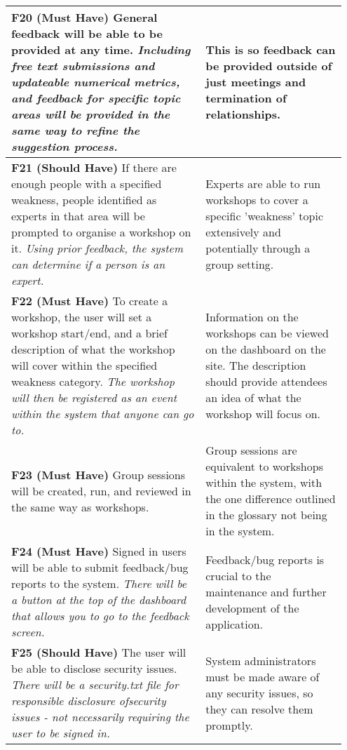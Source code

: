 \documentclass[10pt]{article}
\begin{document}
\begin{longtable}{|p{0.55\linewidth}|p{0.4\linewidth}|}
    \textbf{F20 (Must Have) }
    General feedback will be able to be provided at any time.
    \textit{Including free text submissions and updateable numerical metrics,
    and feedback for specific topic areas will be provided in the same way to
    refine the suggestion process.}
        &
    This is so feedback can be provided outside of just meetings and termination
    of relationships.
    \\ \hline

    \textbf{F21 (Should Have) }
    If there are enough people with a specified weakness, people identified as
    experts in that area will be prompted to organise a workshop on it.
    \textit{Using prior feedback, the system can determine if a person is an
    expert.}
        &
    Experts are able to run workshops to cover a specific 'weakness' topic
    extensively and potentially through a group setting.
    \\ \hline

    \textbf{F22 (Must Have) }
    To create a workshop, the user will set a workshop start/end, and a brief
    description of what the workshop will cover within the specified weakness
    category.
    \textit{The workshop will then be registered as an event within the system
    that anyone can go to.}
        &
    Information on the workshops can be viewed on the dashboard on the site. The
    description should provide attendees an idea of what the workshop will focus
    on.
    \\ \hline

    \textbf{F23 (Must Have) }
    Group sessions will be created, run, and reviewed in the same way as
    workshops.
        &
    Group sessions are equivalent to workshops within the system, with the one
    difference outlined in the glossary not being in the system.
    \\ \hline

    \textbf{F24 (Must Have) }
    Signed in users will be able to submit feedback/bug reports to the system.
    \textit{There will be a button at the top of the dashboard that allows you
    to go to the feedback screen.}
        &
    Feedback/bug reports is crucial to the maintenance and further development
    of the application.
    \\ \hline

    \textbf{F25 (Should Have) }
    The user will be able to disclose security issues.
    \textit{There will be a security.txt file \cite{security_txt} for
    responsible disclosure ofsecurity issues - not necessarily requiring the
    user to be signed in.}
        &
    System administrators must be made aware of any security issues, so they can
    resolve them promptly.
    \\ \hline


\end{longtable}
\end{document}
